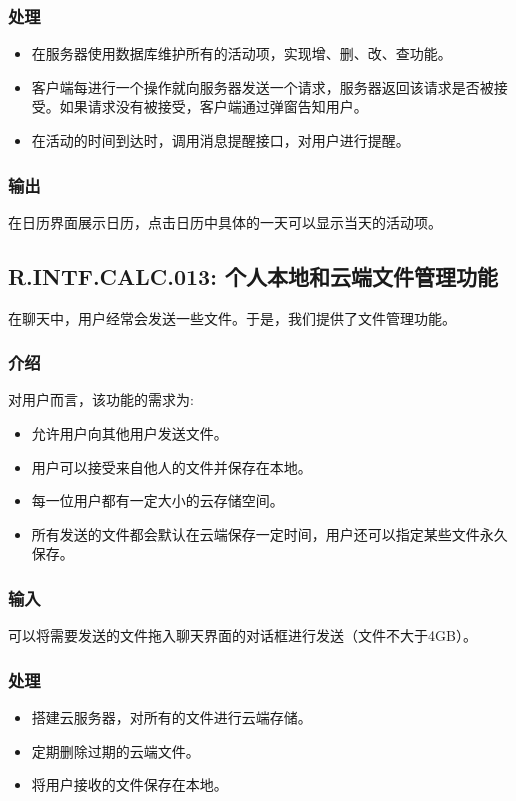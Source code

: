 \subsubsection{处理}
\begin{itemize}
  \item 在服务器使用数据库维护所有的活动项，实现增、删、改、查功能。
  \item 客户端每进行一个操作就向服务器发送一个请求，服务器返回该请求是否被接受。如果请求没有被接受，客户端通过弹窗告知用户。
  \item 在活动的时间到达时，调用消息提醒接口，对用户进行提醒。
\end{itemize}
\subsubsection{输出}
在日历界面展示日历，点击日历中具体的一天可以显示当天的活动项。

\subsection{R.INTF.CALC.013: 个人本地和云端文件管理功能}
在聊天中，用户经常会发送一些文件。于是，我们提供了文件管理功能。
\subsubsection{介绍}
对用户而言，该功能的需求为:
\begin{itemize}
  \item 允许用户向其他用户发送文件。
  \item 用户可以接受来自他人的文件并保存在本地。
  \item 每一位用户都有一定大小的云存储空间。
  \item 所有发送的文件都会默认在云端保存一定时间，用户还可以指定某些文件永久保存。
\end{itemize}
\subsubsection{输入}
可以将需要发送的文件拖入聊天界面的对话框进行发送（文件不大于4GB）。
\subsubsection{处理}
\begin{itemize}
  \item 搭建云服务器，对所有的文件进行云端存储。
  \item 定期删除过期的云端文件。
  \item 将用户接收的文件保存在本地。
\end{itemize}
